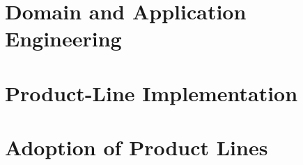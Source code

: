 \documentclass[
	aspectratio=169, %
	8pt, %
	handout, %
]{beamer}
\subtitle{8. Development Process}
\author{Thomas Thüm, Elias Kuiter, Timo Kehrer}
\begin{document}


\section{Domain and Application Engineering}



\lessonslearned{
	\item \ldots
}{
	\item \ldots
}{
	\ldots
}

\sectionend

\section{Product-Line Implementation}




\sectionend

\section{Adoption of Product Lines}



\lessonslearned{
	\item \ldots
}{
	\item \ldots
}{
	\ldots
}

\begin{frame}{\inserttitle}
	\lectureseriesoverview[II]
\end{frame}


\end{document}
